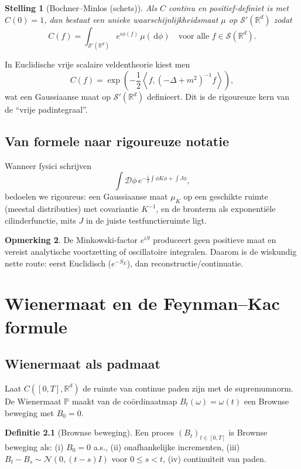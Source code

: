 \documentclass[11pt,a4paper,oneside]{book}
\theoremstyle{plain}
\newtheorem{theorem}{Stelling}[chapter]
\theoremstyle{definition}
\newtheorem{definition}[theorem]{Definitie}
\newtheorem{remark}[theorem]{Opmerking}
\newcommand{\R}{\mathbb{R}}
\renewcommand{\dd}{\,\mathrm{d}}
\newcommand{\PP}{\mathbb{P}}
\newcommand{\cD}{\mathcal{D}}
\newcommand{\cS}{\mathcal{S}}
\newcommand{\inner}[2]{\left\langle #1, #2\right\rangle}
\begin{document}
	\begin{theorem}[Bochner--Minlos (schets)]
		Als $C$ continu en positief-definiet is met $C(0)=1$, dan bestaat een unieke waarschijnlijkheidsmaat $\mu$ op $\cS'(\R^d)$
		zodat
		\[
		C(f)=\int_{\cS'(\R^d)} e^{i\phi(f)}\,\mu(\dd \phi)
		\quad \text{voor alle } f\in \cS(\R^d).
		\]
	\end{theorem}
	
	In Euclidische vrije scalaire veldentheorie kiest men
	\[
	C(f)=\exp\left(-\frac12 \inner{f}{( -\Delta + m^2)^{-1} f}\right),
	\]
	wat een Gaussiaanse maat op $\cS'(\R^d)$ definieert. Dit is de rigoureuze kern van de ``vrije padintegraal''.
	
	\section{Van formele naar rigoureuze notatie}
	Wanneer fysici schrijven
	\[
	\int \cD\phi \, e^{-\frac12\int \phi K \phi + \int J\phi},
	\]
	bedoelen we rigoureus: een Gaussiaanse maat $\mu_K$ op een geschikte ruimte (meestal distributies) met covariantie $K^{-1}$,
	en de bronterm als exponentiële cilinderfunctie, mits $J$ in de juiste testfunctieruimte ligt.
	
	\begin{remark}
		De Minkowski-factor $e^{iS}$ produceert geen positieve maat en vereist analytische voortzetting of oscillatoire integralen.
		Daarom is de wiskundig nette route: eerst Euclidisch ($e^{-S_E}$), dan reconstructie/continuatie.
	\end{remark}
	
	\chapter{Wienermaat en de Feynman--Kac formule}
	
	\section{Wienermaat als padmaat}
	Laat $C([0,T],\R^d)$ de ruimte van continue paden zijn met de supremumnorm. De Wienermaat $\PP$ maakt van de coördinaatmap
	$B_t(\omega)=\omega(t)$ een Brownse beweging met $B_0=0$.
	
	\begin{definition}[Brownse beweging]
		Een proces $(B_t)_{t\in[0,T]}$ is Brownse beweging als:
		(i) $B_0=0$ a.s.,
		(ii) onafhankelijke incrementen,
		(iii) $B_t-B_s\sim \mathcal{N}(0,(t-s)I)$ voor $0\le s<t$,
		(iv) continuïteit van paden.
	\end{definition}
	
\end{document}
